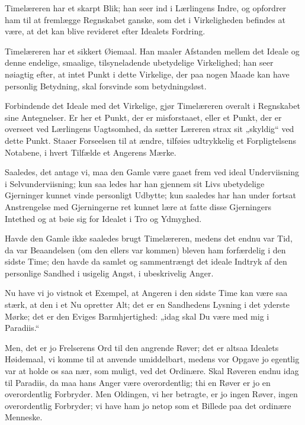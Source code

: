 \documentclass[12pt,a4paper]{book}
\newcommand{\apage}[1]{\marginnote{\footnotesize\textit{[#1]}}}
\begin{document}
Timelæreren har et skarpt Blik; han seer ind i Lærlingens Indre, og
opfordrer ham til at fremlægge Regnskabet ganske, som det i Virkeligheden
befindes at være, at det kan blive revideret efter Idealets Fordring.

Timelæreren har et sikkert Øiemaal. Han maaler Afstanden mellem det Ideale
og denne endelige, smaalige, tilsyneladende ubetydelige Virkelighed; han
seer nøiagtig efter, at intet Punkt i dette Virkelige, der paa nogen Maade
kan have personlig Betydning, skal forsvinde som betydningsløst.

Forbindende det Ideale med det Virkelige, gjør Timelæreren overalt i
Regnskabet sine Antegnelser. Er her et Punkt, der er misforstaaet, eller et
Punkt, der er overseet ved Lærlingens Uagtsomhed, da sætter Læreren strax
sit „skyldig“ ved dette Punkt. Staaer Forseelsen til at ændre, tilføies
udtrykkelig et Forpligtelsens Notabene, i hvert Tilfælde et Angerens
Mærke.

Saaledes, det antage vi, maa den Gamle være gaaet frem ved ideal
Underviisning i Selvunderviisning; kun saa\-%
 \apage{116}ledes har han gjennem sit Livs ubetydelige Gjerninger kunnet vinde
personligt Udbytte; kun saaledes har han under fortsat Anstrengelse med
Gjerningerne ret kunnet lære at fatte disse Gjerningers Intethed og at
bøie sig for Idealet i Tro og Ydmyghed.

Havde den Gamle ikke saaledes brugt Timelæreren, medens det endnu var Tid,
da var Beaandelsen (om den ellers var kommen) bleven ham forfærdelig i den
sidste Time; den havde da samlet og sammentrængt det ideale Indtryk af den
personlige Sandhed i usigelig Angst, i ubeskrivelig Anger.

Nu have vi jo vistnok et Exempel, at Angeren i den sidste Time kan være saa
stærk, at den i et Nu opretter Alt; det er en Sandhedens Lysning i det
yderste Mørke; det er den Eviges Barmhjertighed: „idag skal Du være med mig
i Paradiis.“

Men, det er jo Frelserens Ord til den angrende Røver; det er altsaa
Idealets Høidemaal, vi komme til at anvende umiddelbart, medens vor Opgave
jo egentlig var at holde os saa nær, som muligt, ved det Ordinære. Skal
Røveren endnu idag til Paradiis, da maa hans Anger være overordentlig; thi
en Røver er jo en overordentlig Forbryder. Men Oldingen, vi her betragte,
er jo ingen Røver, ingen overordentlig Forbryder; vi have ham jo netop som
et Billede paa det ordinære Menneske.
\end{document}
